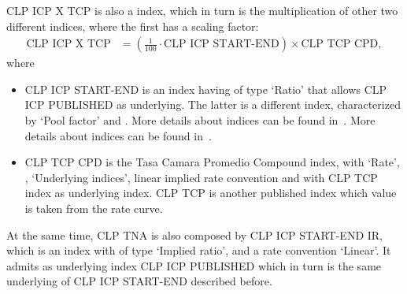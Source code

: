 \documentclass[]{pmv_report} %
\begin{document}
CLP ICP X TCP is also a  index, which in turn is the multiplication of other two different indices, where the first has a scaling factor:
\begin{align}
  \text{CLP ICP X TCP}
    &= \left(\frac{1}{100} \cdot \text{CLP ICP START-END} \right) \times \text{CLP TCP CPD}, \label{eq:TCP1}
\end{align}
where
\begin{itemize}
  \item CLP ICP START-END is an index having   of type `Ratio' that allows CLP ICP PUBLISHED as underlying.
  The latter is a different index, characterized by  `Pool factor' and  .
  More details about  indices can be found in~\cite[Section 3.6.1]{Mx.StaticDataObjects}.
  More details about  indices can be found in~\cite[Section 3.6.4]{Mx.StaticDataObjects}.
  \item CLP TCP CPD is the Tasa Camara Promedio Compound index, with  `Rate',  ,  `Underlying indices', linear implied rate convention and with CLP TCP index as underlying index.
      CLP TCP is another published index which value is taken from the rate curve.
\end{itemize}

At the same time, CLP TNA is also composed by CLP ICP START-END IR, which is an index with   of type `Implied ratio', and a rate convention `Linear'.
It admits as underlying index CLP ICP PUBLISHED which in turn is the same underlying of CLP ICP START-END described before.
\end{document}

